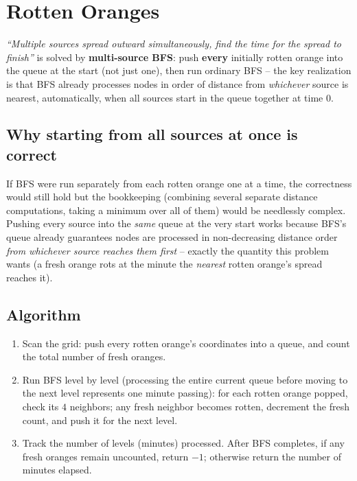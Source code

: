 \section{Rotten Oranges}
\label{sec:graph-rotten-oranges}


\begin{patternbox}
\emph{``Multiple sources spread outward simultaneously, find the time
for the spread to finish''} is solved by \textbf{multi-source BFS}: push
\textbf{every} initially rotten orange into the queue at the start
(not just one), then run ordinary BFS -- the key realization is that
BFS already processes nodes in order of distance from \emph{whichever}
source is nearest, automatically, when all sources start in the queue
together at time $0$.
\end{patternbox}

\subsection*{Why starting from all sources at once is correct}

If BFS were run separately from each rotten orange one at a time, the
correctness would still hold but the bookkeeping (combining several
separate distance computations, taking a minimum over all of them)
would be needlessly complex. Pushing every source into the \emph{same}
queue at the very start works because BFS's queue already guarantees
nodes are processed in non-decreasing distance order \emph{from
whichever source reaches them first} -- exactly the quantity this
problem wants (a fresh orange rots at the minute the \emph{nearest}
rotten orange's spread reaches it).

\subsection*{Algorithm}

\begin{enumerate}
  \item Scan the grid: push every rotten orange's coordinates into a
        queue, and count the total number of fresh oranges.
  \item Run BFS level by level (processing the entire current queue
        before moving to the next level represents one minute
        passing): for each rotten orange popped, check its $4$
        neighbors; any fresh neighbor becomes rotten, decrement the
        fresh count, and push it for the next level.
  \item Track the number of levels (minutes) processed. After BFS
        completes, if any fresh oranges remain uncounted, return $-1$;
        otherwise return the number of minutes elapsed.
\end{enumerate}

